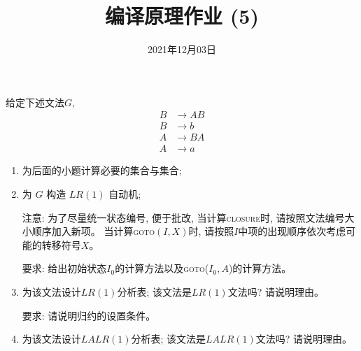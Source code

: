 \documentclass[a4paper, justified]{tufte-handout}
\title{编译原理作业 (5)}
\date{2021年12月03日}
\begin{document}
\maketitle
\noplagiarism %
\begin{abstract}
\end{abstract}
\beginrequired

\begin{problem}[\score{20 = 4 + 8 + 4 + 4}]
  给定下述文法$G$,
  \begin{align}
    B &\to AB \\[8pt]
    B &\to b \\[8pt]
    A &\to BA \\[8pt]
    A &\to a
  \end{align}

  \begin{enumerate}[(1)]
    \item 为后面的小题计算必要的\first{}集合与\follow{}集合;
    \item 为 $G$ 构造 $LR(1)$ 自动机;

      注意: 为了尽量统一状态编号, 便于批改, 当计算\textsc{closure}时, 请按照文法编号大小顺序加入新项。
      当计算\textsc{goto}$(I, X)$时, 请按照$I$中项的出现顺序依次考虑可能的转移符号$X$。

      要求: 给出初始状态$I_{0}$的计算方法以及\textsc{goto}($I_{0}, A$)的计算方法。
    \item 为该文法设计$LR(1)$分析表; 该文法是$LR(1)$文法吗? 请说明理由。

      要求: 请说明归约的设置条件。
    \item 为该文法设计$LALR(1)$分析表; 该文法是$LALR(1)$文法吗? 请说明理由。
  \end{enumerate}
\end{problem}
\end{document}
